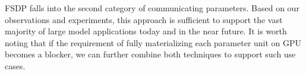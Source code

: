 FSDP falls into the second category of communicating parameters. Based on our observations and experiments, this approach is sufficient to support the vast majority of large model applications today and in the near future. It is worth noting that if the requirement of fully materializing each parameter unit on GPU becomes a blocker, we can further combine both techniques to support such use cases.

